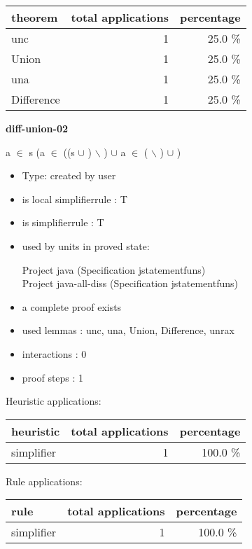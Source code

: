 \documentclass[a4paper]{article}
\begin{document}
\begin{supertabular}{l|r|r}
theorem	        & total applications & percentage \\ \hline
unc & 1 & 25.0 \% \\
Union & 1 & 25.0 \% \\
una & 1 & 25.0 \% \\
Difference & 1 & 25.0 \% \\

\end{supertabular}
\pagebreak

{\LARGE\bf diff-union-02}\label{lemma-diff-union-02}

\medskip

 \Fol \Not a $\in$ s \Imp (a $\in$ ((s $\cup$ ) $\backslash$ ) $\cup$  \Equiv a $\in$ ( $\backslash$ ) $\cup$ )

\begin{itemize}

\item Type: created by user

\item is local simplifierrule : T
\item is simplifierrule : T
\item used by units in proved state:

Project java (Specification jstatementfuns) \\
Project java-all-diss (Specification jstatementfuns)
\item       a complete proof exists
\item       used lemmas  : unc, una, Union, Difference, unrax
\item       interactions : 0
\item       proof steps  : 1
\end{itemize}

\medskip


Heuristic applications:

\begin{supertabular}{l|r|r}
heuristic	& total applications & percentage \\ \hline
simplifier & 1 & 100.0 \% \\

\end{supertabular}

Rule applications:

\begin{supertabular}{l|r|r}
rule	        & total applications & percentage \\ \hline
simplifier & 1 & 100.0 \% \\

\end{supertabular}
\end{document}
